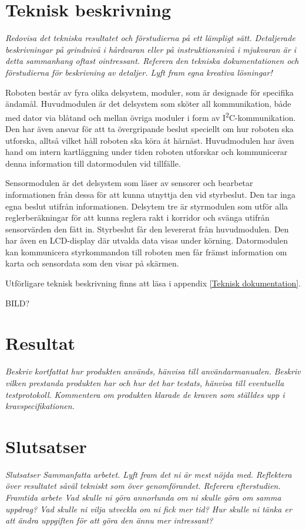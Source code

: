 \documentclass[11pt]{article}
\begin{document}
\begin{flushleft}
\pagebreak

\section{Teknisk beskrivning}
\textit{Redovisa det tekniska resultatet och förstudierna på ett lämpligt sätt. Detaljerade beskrivningar på grindnivå i hårdvaran eller på instruktionsnivå i mjukvaran är i detta sammanhang oftast ointressant. Referera den tekniska dokumentationen och förstudierna för beskrivning av detaljer. Lyft fram egna kreativa lösningar!}

Roboten består av fyra olika delsystem, moduler, som är designade för specifika ändamål. Huvudmodulen är det delsystem som sköter all kommunikation, både med dator via blåtand och mellan övriga moduler i form av I\textsuperscript{2}C-kommunikation. Den har även ansvar för att ta övergripande beslut speciellt om hur roboten ska utforska, alltså vilket håll roboten ska köra åt härnäst. Huvudmodulen har även hand om intern kartläggning under tiden roboten utforskar och kommunicerar denna information till datormodulen vid tillfälle. 

Sensormodulen är det delsystem som läser av sensorer och bearbetar informationen från dessa för att kunna utnyttja den vid styrbeslut. Den tar inga egna beslut utifrån informationen. Delsytem tre är styrmodulen som utför alla reglerberäkningar för att kunna reglera rakt i korridor och svänga utifrån sensorvärden den fått in. Styrbeslut får den levererat från huvudmodulen. Den har även en LCD-display där utvalda data visas under körning. Datormodulen kan kommunicera styrkommandon till roboten men får främst information om karta och sensordata som den visar på skärmen. 

Utförligare teknisk beskrivning finns att läsa i appendix \ref{Teknisk dokumentation}. 

BILD?

\pagebreak

\section{Resultat}
\textit{Beskriv kortfattat hur produkten används, hänvisa till användarmanualen.}
\textit{Beskriv vilken prestanda produkten har och hur det har testats, hänvisa till eventuella testprotokoll.}
\textit{Kommentera om produkten klarade de kraven som ställdes upp i kravspecifikationen. }

\pagebreak

\section{Slutsatser}
\textit{Slutsatser
Sammanfatta arbetet. 
Lyft fram det ni är mest nöjda med.
Reflektera över resultatet såväl tekniskt som över genomförandet. Referera efterstudien.}
\textit{Framtida arbete
Vad skulle ni göra annorlunda om ni skulle göra om samma uppdrag?
Vad skulle ni vilja utveckla om ni fick mer tid?
Hur skulle ni tänka er att ändra uppgiften för att göra den ännu mer intressant?}


\end{flushleft}
\end{document}
